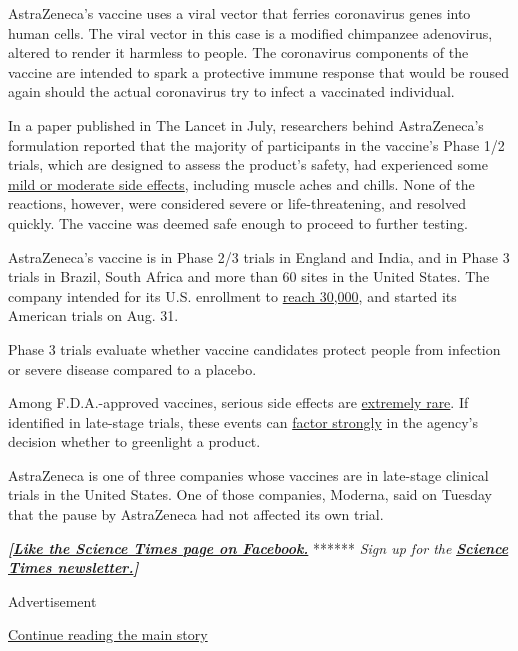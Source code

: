 AstraZeneca's vaccine uses a viral vector that ferries coronavirus genes
into human cells. The viral vector in this case is a modified chimpanzee
adenovirus, altered to render it harmless to people. The coronavirus
components of the vaccine are intended to spark a protective immune
response that would be roused again should the actual coronavirus try to
infect a vaccinated individual.

In a paper published in The Lancet in July, researchers behind
AstraZeneca's formulation reported that the majority of participants in
the vaccine's Phase 1/2 trials, which are designed to assess the
product's safety, had experienced some
\href{https://www.thelancet.com/journals/lancet/article/PIIS0140-6736(20)31604-4/fulltext\#\%20}{mild
or moderate side effects}, including muscle aches and chills. None of
the reactions, however, were considered severe or life-threatening, and
resolved quickly. The vaccine was deemed safe enough to proceed to
further testing.

AstraZeneca's vaccine is in Phase 2/3 trials in England and India, and
in Phase 3 trials in Brazil, South Africa and more than 60 sites in the
United States. The company intended for its U.S. enrollment to
\href{https://www.nih.gov/news-events/news-releases/phase-3-clinical-testing-us-astrazeneca-covid-19-vaccine-candidate-begins}{reach
30,000}, and started its American trials on Aug. 31.

Phase 3 trials evaluate whether vaccine candidates protect people from
infection or severe disease compared to a placebo.

Among F.D.A.-approved vaccines, serious side effects are
\href{https://www.vaccines.gov/basics/safety/side_effects}{extremely
rare}. If identified in late-stage trials, these events can
\href{https://www.fda.gov/media/102332/download}{factor strongly} in the
agency's decision whether to greenlight a product.

AstraZeneca is one of three companies whose vaccines are in late-stage
clinical trials in the United States. One of those companies, Moderna,
said on Tuesday that the pause by AstraZeneca had not affected its own
trial.

\textbf{\emph{{[}}\href{http://on.fb.me/1paTQ1h}{\emph{Like the Science
Times page on Facebook.}}} ****** \emph{\textbar{} Sign up for the}
\textbf{\href{http://nyti.ms/1MbHaRU}{\emph{Science Times
newsletter.}}\emph{{]}}}

Advertisement

\protect\hyperlink{after-bottom}{Continue reading the main story}

